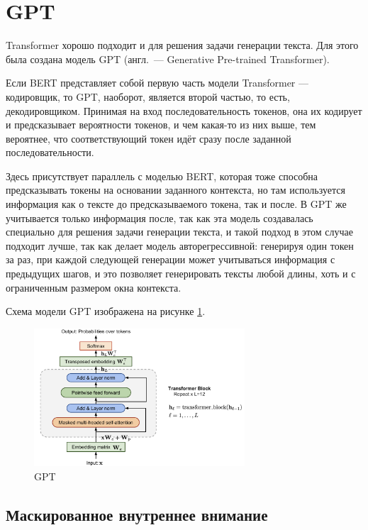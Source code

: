 \section{GPT}

Transformer хорошо подходит и для решения задачи генерации текста. Для этого была создана модель GPT (англ. --- Generative Pre-trained Transformer).

Если BERT представляет собой первую часть модели Transformer --- кодировщик, то GPT, наоборот, является второй частью, то есть, декодировщиком. Принимая на вход последовательность токенов, она их кодирует и предсказывает вероятности токенов, и чем какая-то из них выше, тем вероятнее, что соответствующий токен идёт сразу после заданной последовательности.

Здесь присутствует параллель с моделью BERT, которая тоже способна предсказывать токены на основании заданного контекста, но там используется информация как о тексте до предсказываемого токена, так и после. В GPT же учитывается только информация после, так как эта модель создавалась специально для решения задачи генерации текста, и такой подход в этом случае подходит лучше, так как делает модель авторегрессивной: генерируя один токен за раз, при каждой следующей генерации может учитываться информация с предыдущих шагов, и это позволяет генерировать тексты любой длины, хоть и с ограниченным размером окна контекста.

Схема модели GPT изображена на рисунке \ref*{fig:gpt}.

\begin{figure}[H]
    \centering
    \includegraphics[width=0.7\textwidth]{../inc/images/gpt.png}
    \caption{GPT}
    \label{fig:gpt}
\end{figure}

\subsection{Маскированное внутреннее внимание}

